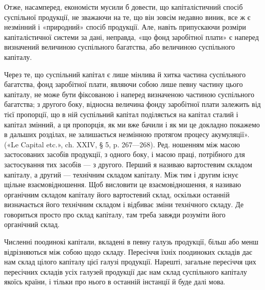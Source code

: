 Отже, насамперед, економісти мусили б довести, що капіталістичний
спосіб суспільної продукції, не зважаючи на те, що він зовсім
недавно виник, все ж є незмінний і «природний» спосіб продукції. Але,
навіть припускаючи розміри капіталістичної системи за дані, неправда,
«що фонд заробітної плати» є наперед визначений величиною суспільного
багатства, або величиною суспільного капіталу.

Через те, що суспільний капітал є лише мінлива й хитка частина
суспільного багатства, фонд заробітної плати, являючи собою лише
певну частину цього капіталу, не може бути фіксованою і наперед визначеною
частиною суспільного багатства; з другого боку, відносна величина
фонду заробітної плати залежить від тієї пропорції, що в ній суспільний
капітал поділяється на капітал сталий і капітал змінний, а ця
пропорція, як ми вже бачили і як ми це докладно покажемо в дальших
розділах, не залишається незмінною протягом процесу акумуляції».
(«Le Capital etc.», ch. XXIV, § 5, p. 267—268). Ред.
ношенням між масою застосованих засобів продукції, з одного
боку, і масою праці, потрібного для застосування тих засобів —
з другого. Перший я називаю вартостевим складом капіталу, а
другий — технічним складом капіталу. Між тим і другим існує
щільне взаємовідношення. Щоб висловити це взаємовідношення,
я називаю органічним складом капіталу його вартостевий склад,
оскільки останній визначається його технічним складом і відбиває
зміни технічного складу. Де говориться просто про склад капіталу,
там треба завжди розуміти його органічний склад.

Численні поодинокі капітали, вкладені в певну галузь продукції,
більш або менш відрізняються між собою щодо складу.
Пересіччя їхніх поодиноких складів дає нам склад цілого капіталу
цієї галузі продукції. Нарешті, загальне пересіччя цих пересічних
складів усіх галузей продукції дає нам склад суспільного
капіталу якоїсь країни, і тільки про нього в останній інстанції
й буде далі мова.

